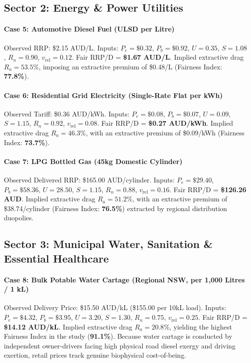 \documentclass[preprint,12pt,authoryear]{elsarticle}
\begin{document}
\subsection{Sector 2: Energy \& Power Utilities}
\paragraph{Case 5: Automotive Diesel Fuel (ULSD per Litre)}
Observed RRP: \$2.15 AUD/L. Inputs: $P_e = \$0.32$, $P_b = \$0.92$, $U = 0.35$, $S = 1.08$, $R_n = 0.90$, $v_{\text{rel}} = 0.12$. Fair RRP/D = \textbf{\$1.67 AUD/L}. Implied extractive drag $R_a = \mathbf{53.5\%}$, imposing an extractive premium of \$0.48/L (Fairness Index: \textbf{77.8\%}).

\paragraph{Case 6: Residential Grid Electricity (Single-Rate Flat per kWh)}
Observed Tariff: \$0.36 AUD/kWh. Inputs: $P_e = \$0.08$, $P_b = \$0.07$, $U = 0.09$, $S = 1.15$, $R_n = 0.92$, $v_{\text{rel}} = 0.08$. Fair RRP/D = \textbf{\$0.27 AUD/kWh}. Implied extractive drag $R_a = \mathbf{46.3\%}$, with an extractive premium of \$0.09/kWh (Fairness Index: \textbf{73.7\%}).

\paragraph{Case 7: LPG Bottled Gas (45kg Domestic Cylinder)}
Observed Delivered RRP: \$165.00 AUD/cylinder. Inputs: $P_e = \$29.40$, $P_b = \$58.36$, $U = 28.50$, $S = 1.15$, $R_n = 0.88$, $v_{\text{rel}} = 0.16$. Fair RRP/D = \textbf{\$126.26 AUD}. Implied extractive drag $R_a = \mathbf{51.2\%}$, with an extractive premium of \$38.74/cylinder (Fairness Index: \textbf{76.5\%}) extracted by regional distribution duopolies.

\subsection{Sector 3: Municipal Water, Sanitation \& Essential Healthcare}
\paragraph{Case 8: Bulk Potable Water Cartage (Regional NSW, per 1,000 Litres / 1 kL)}
Observed Delivery Price: \$15.50 AUD/kL (\$155.00 per 10kL load). Inputs: $P_e = \$4.32$, $P_b = \$3.95$, $U = 3.20$, $S = 1.30$, $R_n = 0.75$, $v_{\text{rel}} = 0.25$. Fair RRP/D = \textbf{\$14.12 AUD/kL}. Implied extractive drag $R_a = \mathbf{20.8\%}$, yielding the highest Fairness Index in the study (\textbf{91.1\%}). Because water cartage is conducted by independent owner-drivers facing high physical road diesel exergy and driving exertion, retail prices track genuine biophysical cost-of-being.
\end{document}
